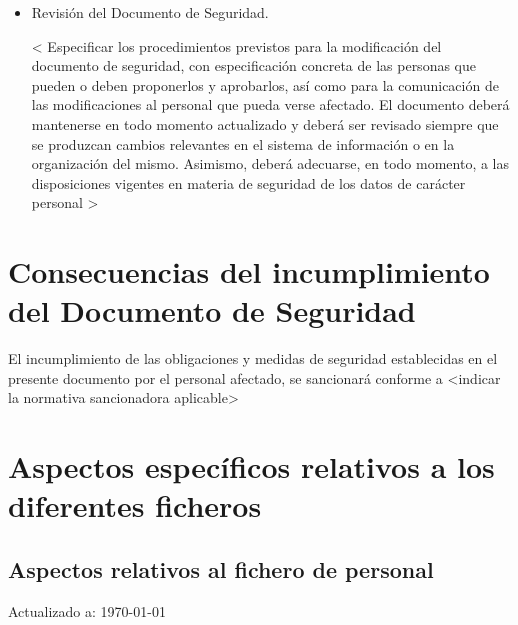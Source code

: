 \documentclass[a4paper,11pt,bibtotoc,noliststotoc]{scrbook}
\begin{document}
\begin{itemize}
\item Revisión del Documento de Seguridad.

< Especificar los procedimientos previstos para la modificación del documento de seguridad, con especificación concreta de las personas que pueden o deben proponerlos y aprobarlos, así como para la comunicación de las modificaciones al personal que pueda verse afectado.
El documento deberá mantenerse en todo momento actualizado y deberá ser revisado siempre que se produzcan cambios relevantes en el sistema de información o en la organización del mismo. Asimismo, deberá adecuarse, en todo momento, a las disposiciones vigentes en materia de seguridad de los datos de carácter personal >

\end{itemize}


\chapter{Consecuencias del incumplimiento del Documento de Seguridad}

El incumplimiento de las obligaciones y medidas de seguridad establecidas en el presente documento por el personal afectado, se sancionará conforme a <indicar la normativa sancionadora aplicable>






\appendix
\chapter{Aspectos específicos relativos a los diferentes ficheros}

\section{Aspectos relativos al fichero de personal}

Actualizado a: \today
\end{document}
